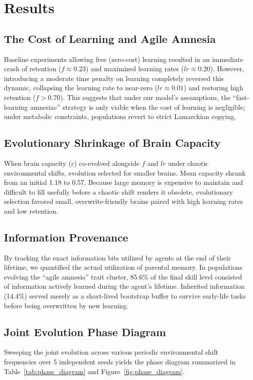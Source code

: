 \documentclass[11pt,a4paper]{article}
\begin{document}
\section{Results}

\subsection{The Cost of Learning and Agile Amnesia}
Baseline experiments allowing free (zero-cost) learning resulted in an immediate crash of retention ($f \approx 0.23$) and maximized learning rates ($lr \approx 0.20$). However, introducing a moderate time penalty on learning completely reversed this dynamic, collapsing the learning rate to near-zero ($lr \approx 0.01$) and restoring high retention ($f > 0.70$). This suggests that under our model's assumptions, the ``fast-learning amnesiac'' strategy is only viable when the cost of learning is negligible; under metabolic constraints, populations revert to strict Lamarckian copying.

\subsection{Evolutionary Shrinkage of Brain Capacity}
When brain capacity ($c$) co-evolved alongside $f$ and $lr$ under chaotic environmental shifts, evolution selected for smaller brains. Mean capacity shrank from an initial 1.18 to 0.57. Because large memory is expensive to maintain and difficult to fill usefully before a chaotic shift renders it obsolete, evolutionary selection favored small, overwrite-friendly brains paired with high learning rates and low retention.

\subsection{Information Provenance}
By tracking the exact information bits utilized by agents at the end of their lifetime, we quantified the actual utilization of parental memory. In populations evolving the ``agile amnesia'' trait cluster, 85.6\% of the final skill level consisted of information actively learned during the agent's lifetime. Inherited information (14.4\%) served merely as a short-lived bootstrap buffer to survive early-life tasks before being overwritten by new learning.

\subsection{Joint Evolution Phase Diagram}
Sweeping the joint evolution across various periodic environmental shift frequencies over 5 independent seeds yields the phase diagram summarized in Table~\ref{tab:phase_diagram} and Figure~\ref{fig:phase_diagram}.
\end{document}
